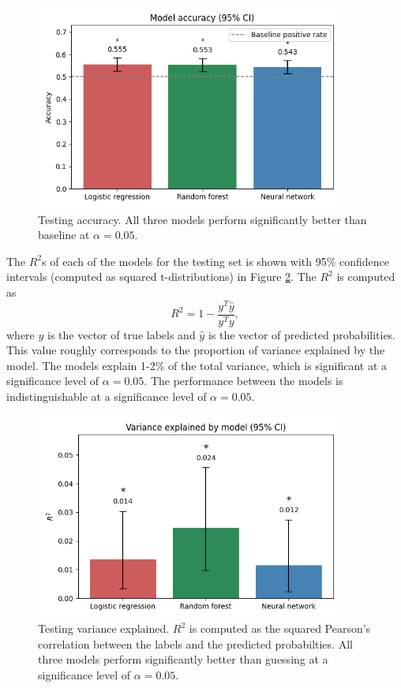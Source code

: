\documentclass[12pt]{article}
\begin{document}
\begin{figure}[h!]
\centering
\includegraphics[width=4in]{"../output/acc.png"}
\caption{Testing accuracy. All three models perform significantly better than baseline at $\alpha = 0.05$.}
\label{fig:acc}
\end{figure}

The $R^{2}$s of each of the models for the testing set is shown with 95\% confidence intervals (computed as squared t-distributions) in Figure \ref{fig:r2}. The $R^{2}$ is computed as 
$$R^{2} = 1 - \frac{y^{T}\hat{y}}{y^{T}y},$$
where $y$ is the vector of true labels and $\hat{y}$ is the vector of predicted probabilities. This value roughly corresponds to the proportion of variance explained by the model. The models explain 1-2\% of the total variance, which is significant at a significance level of $\alpha = 0.05$. The performance between the models is indistinguishable at a significance level of $\alpha = 0.05$.

\begin{figure}[h!]
\centering
\includegraphics[width=4in]{"../output/r2.png"}
\caption{Testing variance explained. $R^{2}$ is computed as the squared Pearson's correlation between the labels and the predicted probabilties. All three models perform significantly better than guessing at a significance level of $\alpha = 0.05$.}
\label{fig:r2}
\end{figure}
\end{document}
